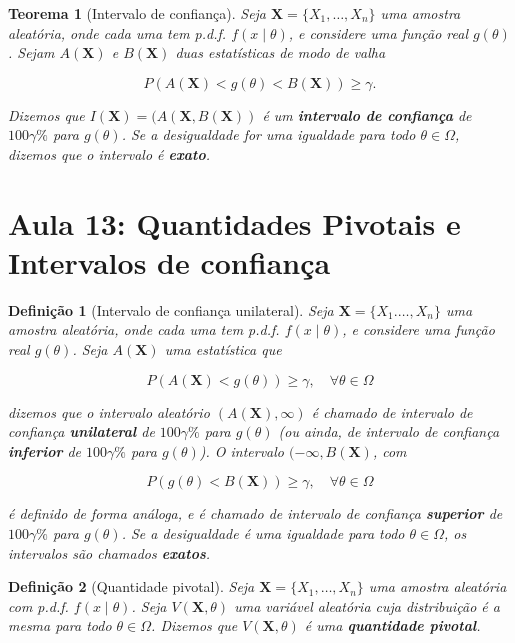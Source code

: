 \documentclass{article}
\newtheorem{theorem}{Teorema}
\newtheorem{definition}{Definição}
\begin{document}
\begin{theorem}[Intervalo de confiança]
Seja $\textbf{X} = \{ X_1, \ldots, X_n \}$ uma amostra aleatória, onde cada uma tem p.d.f. $f(x \mid \theta)$, e considere uma função real $g(\theta)$. Sejam $A(\textbf{X})$ e $B(\textbf{X})$ duas estatísticas de modo de valha

\begin{equation}
    P(A(\textbf{X}) < g(\theta) < B(\textbf{X})) \geq \gamma.
\end{equation}

Dizemos que $I(\textbf{X}) = (A(\textbf{X},B(\textbf{X}))$ é um \textbf{intervalo de confiança} de $100 \gamma \%$ para $g(\theta)$. Se a desigualdade for uma igualdade para todo $\theta \in \Omega$, dizemos que o intervalo é \textbf{exato}.
\end{theorem}

\section*{Aula 13: Quantidades Pivotais e Intervalos de confiança}

\begin{definition}[Intervalo de confiança unilateral]
Seja $\textbf{X} = \{ X_1. \ldots, X_n \}$ uma amostra aleatória, onde cada uma tem p.d.f. $f(x \mid \theta)$, e considere uma função real $g(\theta)$. Seja $A( \textbf{X})$ uma estatística que

$$P(A(\textbf{X}) < g(\theta)) \geq \gamma, \quad \forall \theta \in \Omega$$

dizemos que o intervalo aleatório $( A(\textbf{X}), \infty)$ é chamado de intervalo de confiança \textbf{unilateral} de $100\gamma \%$ para $g(\theta)$ (ou ainda, de intervalo de confiança \textbf{inferior} de $100\gamma \%$ para $g(\theta)$). O intervalo $(-\infty, B(\textbf{X})$, com

$$P(g(\theta) < B(\textbf{X})) \geq \gamma, \quad \forall \theta \in \Omega$$

é definido de forma análoga, e é chamado de intervalo de confiança \textbf{superior} de $100\gamma \%$ para $g(\theta)$. Se a desigualdade é uma igualdade para todo $\theta \in \Omega$, os intervalos são chamados \textbf{exatos}.
\end{definition}

\begin{definition}[Quantidade pivotal]
Seja $\textbf{X} = \{ X_1, \ldots, X_n \}$ uma amostra aleatória com p.d.f. $f(x \mid \theta)$. Seja $V(\textbf{X}, \theta)$ uma variável aleatória cuja distribuição é a mesma para todo $\theta \in \Omega$. Dizemos que $V(\textbf{X}, \theta)$ é uma \textbf{quantidade pivotal}.
\end{definition}
\end{document}
